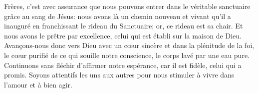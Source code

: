 Frères, c’est avec assurance
		que nous pouvons entrer dans le véritable sanctuaire
		grâce au sang de Jésus:
	nous avons là un chemin nouveau et vivant qu’il a inauguré
		en franchissant le rideau du Sanctuaire;
	or, ce rideau est sa chair.
Et nous avons le prêtre par excellence,
	celui qui est établi sur la maison de Dieu.
Avançons-nous donc vers Dieu avec un cœur sincère
		et dans la plénitude de la foi,
	le cœur purifié de ce qui souille notre conscience,
	le corps lavé par une eau pure.
Continuons sans fléchir d’affirmer notre espérance,
	car il est fidèle, celui qui a promis.
Soyons attentifs les uns aux autres
	pour nous stimuler à vivre dans l’amour et à bien agir.
